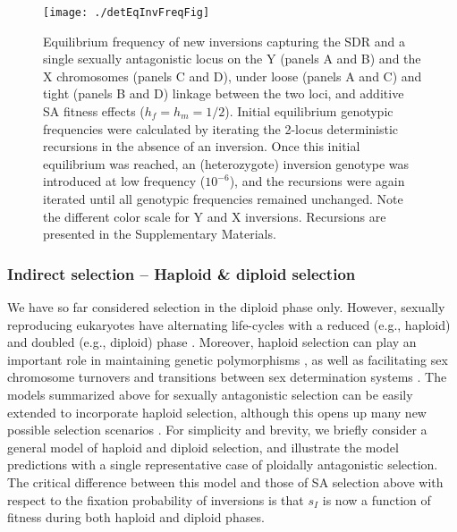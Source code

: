 \documentclass{article}
\begin{document}


 \begin{figure}[!htbp]
 \centering
 \texttt{[image: ./detEqInvFreqFig]}
 \caption{Equilibrium frequency of new inversions capturing the SDR and a single sexually antagonistic locus on the Y (panels A and B) and the X chromosomes (panels C and D), under loose (panels A and C) and tight (panels B and D) linkage between the two loci, and additive SA fitness effects ($h_f = h_m = 1/2$). Initial equilibrium genotypic frequencies were calculated by iterating the 2-locus deterministic recursions in the absence of an inversion. Once this initial equilibrium was reached, an (heterozygote) inversion genotype was introduced at low frequency ($10^{-6}$), and the recursions were again iterated until all genotypic frequencies remained unchanged. Note the different color scale for Y and X inversions. Recursions are presented in the Supplementary Materials.}
 \label{fig:detInvFreqSA}
 \end{figure}



\subsubsection*{Indirect selection -- Haploid \& diploid selection}

We have so far considered selection in the diploid phase only. However, sexually reproducing eukaryotes have alternating life-cycles with a reduced (e.g., haploid) and doubled (e.g., diploid) phase \citep{Strasburger1894, Roe1975}. Moreover, haploid selection can play an important role in maintaining genetic polymorphisms \citep{ImmlerOtto2011}, as well as facilitating sex chromosome turnovers \citep{OttoScottOsmond2018} and transitions between sex determination systems \citep{MuralidharVeller2018}. The models summarized above for sexually antagonistic selection can be easily extended to incorporate haploid selection, although this opens up many new possible selection scenarios \citep{ImmlerOtto2011, OttoScottOsmond2018}. For simplicity and brevity, we briefly consider a general model of haploid and diploid selection, and illustrate the model predictions with a single representative case of ploidally antagonistic selection. The critical difference between this model and those of SA selection above with respect to the fixation probability of inversions is that $s_I$ is now a function of fitness during both haploid and diploid phases. 
\end{document}
